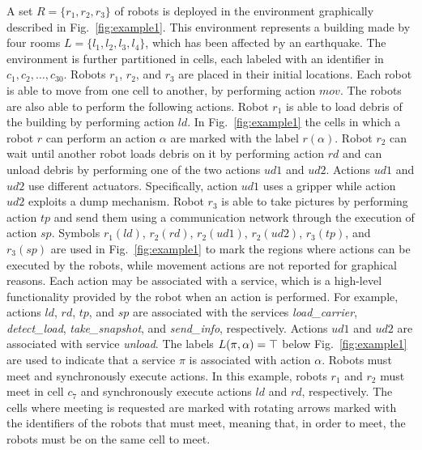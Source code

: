 A set $R=\{r_1, r_2, r_3 \}$ of robots  is deployed in the environment graphically described in  Fig.~\ref{fig:example1}.
This environment represents a building made by four rooms $L=\{ l_1, l_2, l_3, l_4 \}$, which has been affected by an earthquake.
The environment is further partitioned in cells, each labeled with an identifier in $c_1, c_2, \ldots, c_{30}$.
Robots $r_1$, $r_2$, and $r_3$ are placed in their initial locations.
Each robot is able to move from one cell to another, by performing action $mov$.
The robots are also able to perform the following actions.
Robot $r_1$ is able to load debris of the building by performing action $ld$. 
In Fig.~\ref{fig:example1} the cells in which a robot $r$ can perform an action $\alpha$ are marked with the label $r(\alpha)$.
Robot $r_2$ can wait until another robot loads debris on it by performing action $rd$ and can unload debris by performing one of the two actions $ud1$ and $ud2$. 
Actions $ud1$ and $ud2$ use different actuators.
Specifically, action $ud1$ uses a gripper while action $ud2$ exploits a dump mechanism.
Robot $r_3$ is able to take pictures by performing action $tp$ and send them using a communication network through the execution of action $sp$. 
Symbols $r_1(ld)$, $r_2(rd)$, $r_2(ud1)$, $r_2(ud2)$, $r_3(tp)$, and $r_3(sp)$ are used in Fig.~\ref{fig:example1} to mark the regions where  actions can be executed by the robots, while movement actions are not reported for graphical reasons.
Each action may be associated with a service, which is a high-level functionality provided by the robot when an action is performed.
For example, actions $ld$, $rd$, $tp$, and $sp$  are associated with the services \emph{load\_carrier}, \emph{detect\_load}, \emph{take\_snapshot}, and \emph{send\_info}, respectively.
Actions $ud1$ and $ud2$ are associated with service \emph{unload}.
The labels $L(\pi,\alpha)=\top$ below Fig.~\ref{fig:example1} are used to indicate that a service $\pi$ is associated with  action $\alpha$. 
Robots must meet and  synchronously execute actions. 
In this example, robots $r_1$ and  $r_2$ must meet  in cell $c_7$ and synchronously execute actions $ld$ and $rd$, respectively. 
The cells where meeting is requested are marked with rotating arrows marked with the identifiers of the robots that must meet, meaning that, in order to meet, the robots must be on the same cell to meet.


